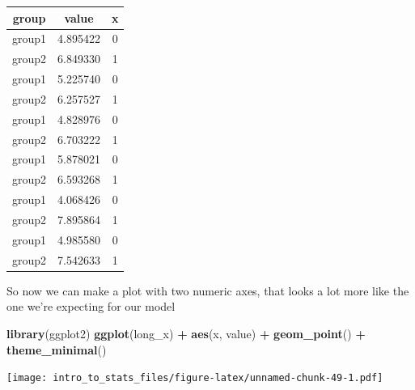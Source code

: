 \documentclass[
]{book}
\newenvironment{Shaded}{\begin{snugshade}}{\end{snugshade}}
\newcommand{\DataTypeTok}[1]{\textcolor[rgb]{0.13,0.29,0.53}{#1}}
\newcommand{\DecValTok}[1]{\textcolor[rgb]{0.00,0.00,0.81}{#1}}
\newcommand{\KeywordTok}[1]{\textcolor[rgb]{0.13,0.29,0.53}{\textbf{#1}}}
\newcommand{\NormalTok}[1]{#1}
\newcommand{\OperatorTok}[1]{\textcolor[rgb]{0.81,0.36,0.00}{\textbf{#1}}}
\newcommand{\StringTok}[1]{\textcolor[rgb]{0.31,0.60,0.02}{#1}}
\begin{document}
\begin{Shaded}
\end{Shaded}

\begin{tabular}{c|c|c}
\hline
group & value & x\\
\hline
group1 & 4.895422 & 0\\
\hline
group2 & 6.849330 & 1\\
\hline
group1 & 5.225740 & 0\\
\hline
group2 & 6.257527 & 1\\
\hline
group1 & 4.828976 & 0\\
\hline
group2 & 6.703222 & 1\\
\hline
group1 & 5.878021 & 0\\
\hline
group2 & 6.593268 & 1\\
\hline
group1 & 4.068426 & 0\\
\hline
group2 & 7.895864 & 1\\
\hline
group1 & 4.985580 & 0\\
\hline
group2 & 7.542633 & 1\\
\hline
\end{tabular}

So now we can make a plot with two numeric axes, that looks a lot more like the one we're expecting for our model

\begin{Shaded}
\begin{Highlighting}[]
\KeywordTok{library}\NormalTok{(ggplot2)}
  \KeywordTok{ggplot}\NormalTok{(long_x) }\OperatorTok{+}\StringTok{ }\KeywordTok{aes}\NormalTok{(x, value) }\OperatorTok{+}\StringTok{ }\KeywordTok{geom_point}\NormalTok{() }\OperatorTok{+}\StringTok{ }\KeywordTok{theme_minimal}\NormalTok{() }
\end{Highlighting}
\end{Shaded}

\texttt{[image: intro\_to\_stats\_files/figure-latex/unnamed-chunk-49-1.pdf]}
\end{document}
